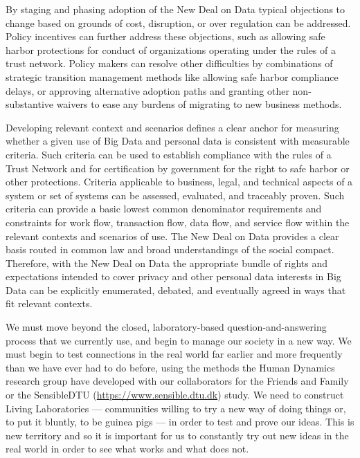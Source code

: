 By staging and phasing adoption of the New Deal on Data typical objections to change based on grounds of cost, disruption, or over regulation can be addressed.
Policy incentives can further address these objections, such as allowing safe harbor protections for conduct of organizations operating under the rules of a trust network.
Policy makers can resolve other difficulties by combinations of strategic transition management methods like allowing safe harbor compliance delays, or approving alternative adoption paths and granting other non-substantive waivers to ease any burdens of migrating to new business methods.   
 
Developing relevant context and scenarios defines a clear anchor for measuring whether a given use of Big Data and personal data is consistent with measurable criteria.
Such criteria can be used to establish compliance with the rules of a Trust Network and for certification by government for the right to safe harbor or other protections.
Criteria applicable to business, legal, and technical aspects of a system or set of systems can be assessed, evaluated, and traceably proven.
Such criteria can provide a basic lowest common denominator requirements and constraints for work flow, transaction flow, data flow, and service flow within the relevant contexts and scenarios of use.
The New Deal on Data provides a clear basis routed in common law and broad understandings of the social compact.
Therefore, with the New Deal on Data the appropriate bundle of rights and expectations intended to cover privacy and other personal data interests in Big Data can be explicitly enumerated, debated, and eventually agreed in ways that fit relevant contexts.  


We must move beyond the closed, laboratory-based question-and-answering process that we currently use, and begin to manage our society in a new way.
We must begin to test connections in the real world far earlier and more frequently than we have ever had to do before, using the methods the Human Dynamics research group have developed with our collaborators for the Friends and Family~\cite{aharony2011social} or the SensibleDTU (\url{https://www.sensible.dtu.dk}) study. 
We need to construct Living Laboratories --- communities willing to try a new way of doing things or, to put it bluntly, to be guinea pigs --- in order to test and prove our ideas.
This is new territory and so it is important for us to constantly try out new ideas in the real world in order to see what works and what does not.

